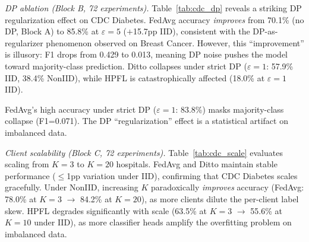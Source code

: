 \documentclass[conference]{IEEEtran}
\begin{document}
\smallskip\noindent\textit{DP ablation (Block B, 72 experiments).} Table~\ref{tab:cdc_dp} reveals a striking DP regularization effect on CDC Diabetes. FedAvg accuracy \textit{improves} from 70.1\% (no DP, Block A) to 85.8\% at $\varepsilon{=}5$ ($+$15.7pp IID), consistent with the DP-as-regularizer phenomenon observed on Breast Cancer. However, this ``improvement'' is illusory: F1 drops from 0.429 to 0.013, meaning DP noise pushes the model toward majority-class prediction. Ditto collapses under strict DP ($\varepsilon{=}1$: 57.9\% IID, 38.4\% NonIID), while HPFL is catastrophically affected (18.0\% at $\varepsilon{=}1$ IID).

\begin{table}[htbp]
\centering
\caption{CDC Diabetes: DP Ablation (Block B, 72 exp.). $K{=}5$, IID and NonIID. Mean $\pm$ std over 3 seeds. Acc (\%) / F1.}
\label{tab:cdc_dp}
\par{\footnotesize FedAvg's high accuracy under strict DP ($\varepsilon{=}1$: 83.8\%) masks majority-class collapse (F1=0.071). The DP ``regularization'' effect is a statistical artifact on imbalanced data.}
\end{table}

\smallskip\noindent\textit{Client scalability (Block C, 72 experiments).} Table~\ref{tab:cdc_scale} evaluates scaling from $K{=}3$ to $K{=}20$ hospitals. FedAvg and Ditto maintain stable performance ($\leq$1pp variation under IID), confirming that CDC Diabetes scales gracefully. Under NonIID, increasing $K$ paradoxically \textit{improves} accuracy (FedAvg: 78.0\% at $K{=}3$ $\to$ 84.2\% at $K{=}20$), as more clients dilute the per-client label skew. HPFL degrades significantly with scale (63.5\% at $K{=}3$ $\to$ 55.6\% at $K{=}10$ under IID), as more classifier heads amplify the overfitting problem on imbalanced data.
\end{document}
